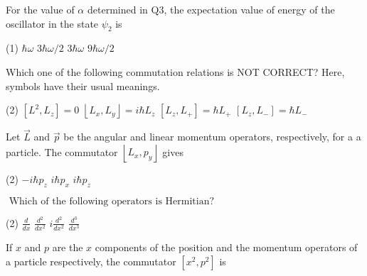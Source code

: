 \begin{enumerate}
\begin{minipage}{\textwidth}
	\item For the value of $\alpha$ determined in $\mathrm{Q} 3$, the expectation value of energy of the oscillator in the state $\psi_{2}$ is
\end{minipage}
\begin{tasks}(1)
	\task[\textbf{A.}] $\hbar \omega$
	\task[\textbf{B.}]$3 \hbar \omega / 2$ 
	\task[\textbf{C.}]$3 \hbar \omega$
	\task[\textbf{D.}]$9 \hbar \omega / 2$
\end{tasks}
\begin{minipage}{\textwidth}
	\item Which one of the following commutation relations is NOT CORRECT? Here, symbols have their usual meanings.
\end{minipage}
\begin{tasks}(2)
	\task[\textbf{A.}] $\left[L^{2}, L_{z}\right]=0$
	\task[\textbf{B.}]$\left\lfloor L_{x}, L_{y}\right\rfloor=i \hbar L_{z}$
	\task[\textbf{C.}]$\left[L_{z}, L_{+}\right]=\hbar L_{+}$
	\task[\textbf{D.}] $\left[L_{z}, L_{-}\right]=\hbar L_{-}$
\end{tasks}
\begin{minipage}{\textwidth}
	\item Let $\vec{L}$ and $\vec{p}$ be the angular and linear momentum operators, respectively, for a a particle. The commutator $\left\lfloor L_{x}, p_{y}\right\rfloor$ gives
\end{minipage}
\begin{tasks}(2)
	\task[\textbf{A.}] $-i \hbar p_{z}$
	\task[\textbf{C.}]$i \hbar p_{x}$
	\task[\textbf{D.}]$i \hbar p_{z}$
\end{tasks}
\begin{minipage}{\textwidth}
	\item $\text { Which of the following operators is Hermitian? }$
\end{minipage}
\begin{tasks}(2)
	\task[\textbf{A.}] $\frac{d}{d x}$
	\task[\textbf{B.}]$\frac{d^{2}}{d x^{2}}$
	\task[\textbf{C.}]$i \frac{d^{2}}{d x^{2}}$
	\task[\textbf{D.}]$\frac{d^{3}}{d x^{3}}$
\end{tasks}
\begin{minipage}{\textwidth}
	\item If $x$ and $p$ are the $x$ components of the position and the momentum operators of a particle respectively, the commutator $\left[x^{2}, p^{2}\right]$ is
\end{minipage}

\end{enumerate}
